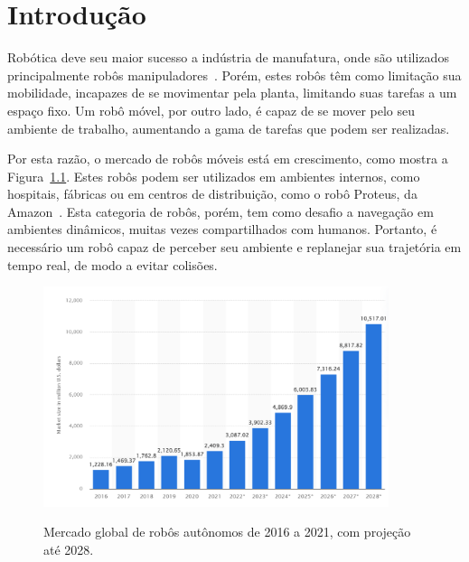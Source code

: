 \documentclass[repeatfields,xlists,xpacks,oneside,yearsonly]{ufrgscca}
\begin{document}

\tableofcontents

\chapter{Introdução}

Robótica deve seu maior sucesso a indústria de manufatura, onde são utilizados
principalmente robôs manipuladores~\cite{IntroductionToMobileRobots}.
Porém, estes robôs têm como limitação sua mobilidade, incapazes de se movimentar
pela planta, limitando suas tarefas a um espaço fixo.
Um robô móvel, por outro lado, é capaz de se mover pelo seu ambiente de
trabalho, aumentando a gama de tarefas que podem ser realizadas.

Por esta razão, o mercado de robôs móveis está em crescimento, como mostra a
Figura~\ref{fig:mercado_robo}.
Estes robôs podem ser utilizados em ambientes internos, como hospitais, fábricas
ou em centros de distribuição, como o robô Proteus, da Amazon~\cite{amazon_robot}.
Esta categoria de robôs, porém, tem como desafio a navegação em ambientes dinâmicos,
muitas vezes compartilhados com humanos.
Portanto, é necessário um robô capaz de perceber seu ambiente e replanejar sua
trajetória em tempo real, de modo a evitar colisões.

\begin{figure}[htbp]
    {
        \centering
        \caption{Mercado global de robôs autônomos de 2016 a 2021, com projeção até 2028.}
        \label{fig:mercado_robo}
        \includegraphics[width=0.9\textwidth]{mercado_robo}\\
    }
    {}
\end{figure}
\end{document}
